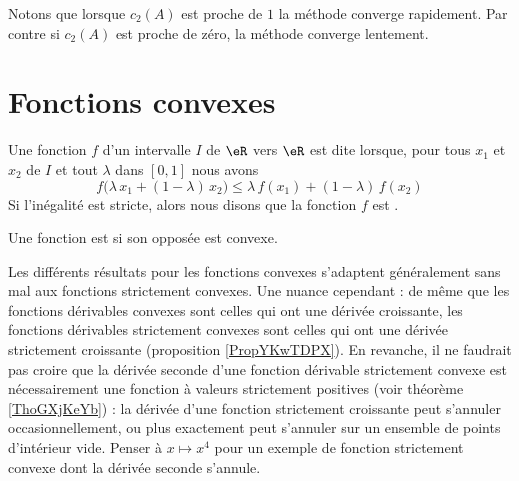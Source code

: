 Notons que lorsque \( c_2(A)\) est proche de \( 1\) la méthode converge rapidement. Par contre si \( c_2(A)\) est proche de zéro, la méthode converge lentement.

\section{Fonctions convexes}

\begin{definition}  \label{DefVQXRJQz}
    Une fonction $f$ d’un intervalle $I$ de \( \eR\) vers \( \eR\) est dite  lorsque, pour tous \( x_1\) et \( x_2\) de $I$ et tout $\lambda$ dans $[0, 1]$ nous avons
    \begin{equation}        \label{EQooYNAPooFePQZy}
        f\big(\lambda\, x_1+(1-\lambda)\, x_2\big) \leq \lambda\, f(x_1)+(1-\lambda)\, f(x_2)
    \end{equation}
    Si l'inégalité est stricte, alors nous disons que la fonction \( f\) est .

    Une fonction est  si son opposée est convexe.
\end{definition}


\begin{normaltext}
    Les différents résultats pour les fonctions convexes s'adaptent généralement sans mal aux fonctions strictement convexes. Une nuance cependant : de même que les fonctions dérivables convexes sont celles qui ont une dérivée croissante, les fonctions dérivables strictement convexes sont celles qui ont une dérivée strictement croissante (proposition \ref{PropYKwTDPX}). En revanche, il ne faudrait pas croire que la dérivée seconde d'une fonction dérivable strictement convexe est nécessairement une fonction à valeurs strictement positives (voir théorème \ref{ThoGXjKeYb}) : la dérivée d'une fonction strictement croissante peut s'annuler occasionnellement, ou plus exactement peut s'annuler sur un ensemble de points d'intérieur vide. Penser à \( x\mapsto x^4\) pour un exemple de fonction strictement convexe dont la dérivée seconde s'annule.
\end{normaltext}

